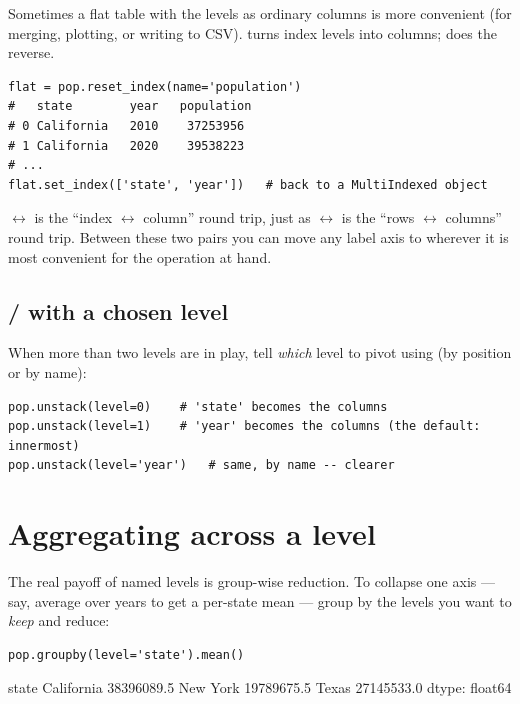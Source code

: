 \documentclass[11pt]{article}
\begin{document}
Sometimes a flat table with the levels as ordinary columns is more convenient (for merging, plotting, or writing to CSV).  turns index levels into columns;  does the reverse.

\begin{lstlisting}
flat = pop.reset_index(name='population')
#   state        year   population
# 0 California   2010    37253956
# 1 California   2020    39538223
# ...
flat.set_index(['state', 'year'])   # back to a MultiIndexed object
\end{lstlisting}

\begin{intuition}
 $\leftrightarrow$  is the ``index $\leftrightarrow$ column'' round trip, just as  $\leftrightarrow$  is the ``rows $\leftrightarrow$ columns'' round trip. Between these two pairs you can move any label axis to wherever it is most convenient for the operation at hand.
\end{intuition}

\subsection{/ with a chosen level}

When more than two levels are in play, tell  \emph{which} level to pivot using  (by position or by name):

\begin{lstlisting}
pop.unstack(level=0)    # 'state' becomes the columns
pop.unstack(level=1)    # 'year' becomes the columns (the default: innermost)
pop.unstack(level='year')   # same, by name -- clearer
\end{lstlisting}

\section{Aggregating across a level}

The real payoff of named levels is group-wise reduction. To collapse one axis --- say, average over years to get a per-state mean --- group by the levels you want to \emph{keep} and reduce:

\begin{lstlisting}
pop.groupby(level='state').mean()
\end{lstlisting}

\begin{outblock}
state
California    38396089.5
New York      19789675.5
Texas         27145533.0
dtype: float64
\end{outblock}
\end{document}
